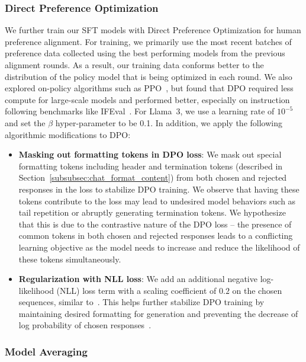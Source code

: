 \subsubsection{Direct Preference Optimization}
\label{subsubsec:postdpo}

We further train our SFT models with Direct Preference Optimization \citep[DPO;][]{rafailov2024direct} for human preference alignment. For training, we primarily use the most recent batches of preference data collected using the best performing models from the previous alignment rounds. As a result, our training data conforms better to the distribution of the policy model that is being optimized in each round. We also explored on-policy algorithms such as PPO~\citep{schulman2017proximal}, but found that DPO required less compute for large-scale models and performed better, especially on instruction following benchmarks like IFEval~\citep{zhou2023instruction}.
For Llama~3, we use a learning rate of $10^{-5}$ and set the $\beta$ hyper-parameter to be 0.1. In addition, we apply the following algorithmic modifications to DPO:

\begin{itemize}
    \item \textbf{Masking out formatting tokens in DPO loss}: We mask out special formatting tokens including header and termination tokens (described in Section~\ref{subsubsec:chat_format_content}) from both chosen and rejected responses in the loss to stabilize DPO training. We observe that having these tokens contribute to the loss may lead to undesired model behaviors such as tail repetition or abruptly generating termination tokens. We hypothesize that this is due to the contrastive nature of the DPO loss -- the presence of common tokens in both chosen and rejected responses leads to a conflicting learning objective as the model needs to increase and reduce the likelihood of these tokens simultaneously. 
    \item \textbf{Regularization with NLL loss}: We add an additional negative log-likelihood (NLL)  loss term with a scaling coefficient of $0.2$ on the chosen sequences, similar to~\citet{pang2024iterative}. This helps further stabilize DPO training by maintaining desired formatting for generation and preventing the decrease of log probability of chosen responses~\citep{pang2024iterative, pal2024smaug}. 
\end{itemize}

\subsubsection{Model Averaging}

